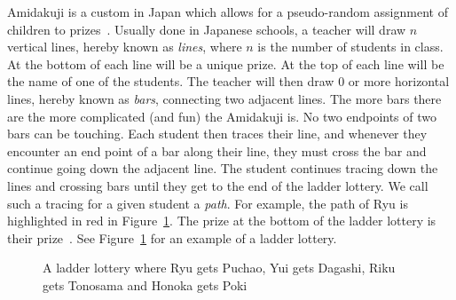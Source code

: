 
\vspace{-10mm}
Amidakuji is a custom in Japan which 
allows for a pseudo-random assignment of children to prizes~\cite{A1}. 
Usually done in Japanese schools, a teacher will draw $n$ vertical lines, 
hereby known as \emph{lines}, where $n$ is the number of students in class. 
At the bottom of each line will be a unique prize. At the top of each line will be the name of one of the students.  
The teacher will then draw 0 or more horizontal lines, hereby known as \emph{bars}, 
connecting two adjacent lines. The more bars there are the more complicated (and fun) 
the Amidakuji is. No two endpoints of two bars can be touching. Each student then traces 
their line, and whenever they encounter an end point of a bar along their line, 
they must cross the bar and continue going down the adjacent line. 
The student continues tracing down the lines and crossing bars 
until they get to the end of the ladder lottery. We call such a tracing for a given student 
a \emph{path}. For example, the path of Ryu is highlighted in red in Figure~\ref{fig:aa}. The prize at the bottom of the ladder lottery 
is their prize~\cite{A1}. See Figure~\ref{fig:aa} for an example of a ladder lottery.
\begin{center}
\vspace{-5mm}
\begin{figure}[h]
	\centering
\caption{A ladder lottery where Ryu gets Puchao, Yui gets Dagashi, Riku gets Tonosama and Honoka gets Poki}
\label{fig:aa}
\end{figure}
\end{center}

